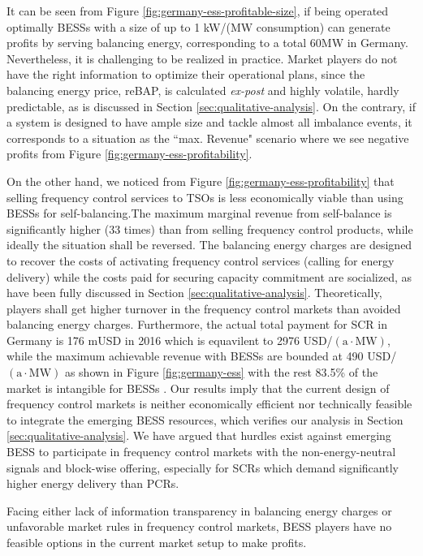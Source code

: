 It can be seen from Figure \ref{fig:germany-ess-profitable-size}, if being operated optimally BESSs with a size of up to 1 kW/(MW consumption) can generate profits by serving balancing energy, corresponding to a total 60MW in Germany. Nevertheless, it is challenging to be realized in practice. Market players do not have the right information to optimize their operational plans, since the balancing energy price, reBAP, is calculated \textit{ex-post} and highly volatile, hardly predictable, as is discussed in Section \ref{sec:qualitative-analysis}. On the contrary, if a system is designed to have ample size and tackle almost all imbalance events, it corresponds to a situation as the ``max. Revenue" scenario where we see negative profits from Figure \ref{fig:germany-ess-profitability}.

On the other hand, we noticed from Figure \ref{fig:germany-ess-profitability} that selling frequency control services to TSOs is less economically viable than using BESSs for self-balancing.The maximum marginal revenue from self-balance is significantly higher (33 times) than from selling frequency control products, while ideally the situation shall be reversed. The balancing energy charges are designed to recover the costs of activating frequency control services (calling for energy delivery) while the costs paid for securing capacity commitment are socialized, as have been fully discussed in Section \ref{sec:qualitative-analysis}. Theoretically, players shall get higher turnover in the frequency control markets than avoided balancing energy charges. Furthermore, the actual total payment for SCR in Germany is 176 mUSD in 2016 which is equavilent to \num{2976} USD/$(\text{a} \cdot \text{MW})$, while the maximum achievable revenue with BESSs are bounded at \num{490} USD/$(\text{a} \cdot \text{MW})$ as shown in Figure \ref{fig:germany-ess} with the rest 83.5\% of the market is intangible for BESSs . Our results imply that the current design of frequency control markets is neither economically efficient nor technically feasible to integrate the emerging BESS resources, which verifies our analysis in Section \ref{sec:qualitative-analysis}. We have argued that hurdles exist against emerging BESS to participate in frequency control markets with the non-energy-neutral signals and block-wise offering, especially for SCRs which demand significantly higher energy delivery than PCRs.

Facing either lack of information transparency in balancing energy charges or unfavorable market rules in frequency control markets, BESS players have no feasible options in the current market setup to make profits.

